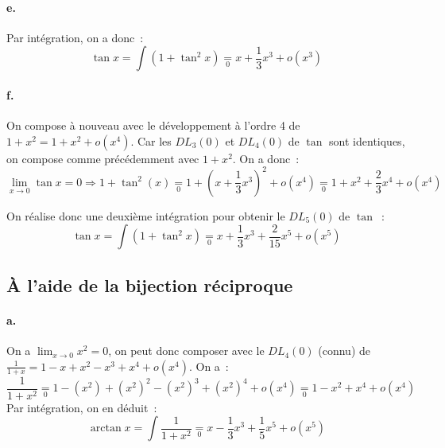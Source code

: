 \documentclass{article}
\newcommand{\oo}[1]{+ o\!\left(#1\right)}
\begin{document}
    \paragraph{e.} Par intégration, on a donc~:
    \begin{displaymath}
      \tan x = \int(1 + \tan^2 x) \underset{0}{=} x + \frac{1}{3}x^3 \oo{x^3}
    \end{displaymath}

    \paragraph{f.} On compose à nouveau avec le développement à l'ordre 4 de $1 + x^2 = 1 + x^2 \oo{x^4}$. Car les $DL_3(0)$ et $DL_4(0)$ de $\tan$ sont identiques, on compose comme précédemment avec $1 + x^2$. On a donc~:
    \begin{displaymath}
      \lim_{x\to 0}\tan x = 0 \Rightarrow 1 + \tan^2(x) \underset{0}{=} 1 + \left(x + \frac{1}{3}x^3\right)^2 \oo{x^4} \underset{0}{=} 1 + x^2 + \frac{2}{3}x^4 \oo{x^4}
    \end{displaymath}

    On réalise donc une deuxième intégration pour obtenir le $DL_5(0)$ de $\tan$~:
    \begin{displaymath}
      \tan x = \int(1 + \tan^2 x) \underset{0}{=} x + \frac{1}{3}x^3 + \frac{2}{15}x^5 \oo{x^5}
    \end{displaymath}

    \subsection{À l'aide de la bijection réciproque}

    \paragraph{a.} On a $\lim_{x\to 0} x^2 = 0$, on peut donc composer avec le $DL_4(0)$ (connu) de $\frac{1}{1+x} = 1 - x + x^2 - x^3 + x^4 \oo{x^4}$. On a~:
    \begin{displaymath}
      \frac{1}{1+x^2} \underset{0}{=} 1 - (x^2) + (x^2)^2 - (x^2)^3 + (x^2)^4 \oo{x^4} \underset{0}{=} 1 - x^2 + x^4 \oo{x^4}
    \end{displaymath}
    Par intégration, on en déduit~:
    \begin{displaymath}
      \arctan x = \int\frac{1}{1 + x^2} \underset{0}{=} x - \frac{1}{3}x^3 + \frac{1}{5}x^5 \oo{x^5}
    \end{displaymath}
\end{document}
